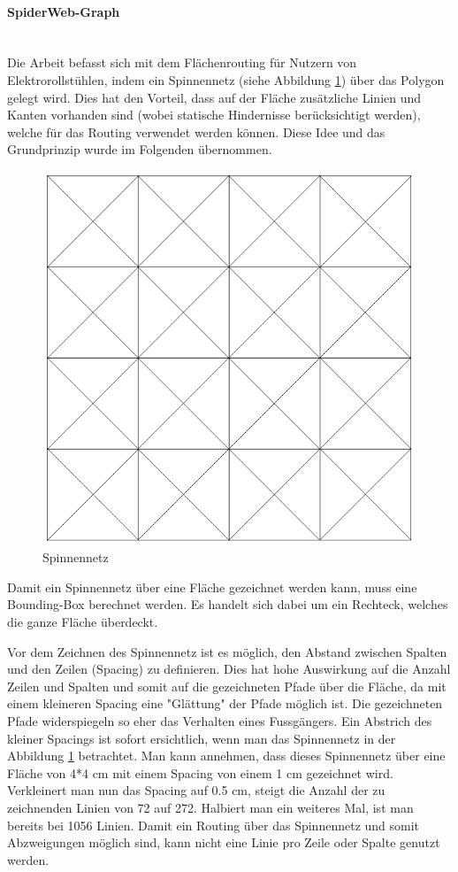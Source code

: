 \paragraph{SpiderWeb-Graph}\label{solution:SpiderWeb-Graph}~\\
Die Arbeit \cite{dzafic_spider_web_graph} befasst sich mit dem Flächenrouting für Nutzern von Elektrorollstühlen, indem ein Spinnennetz (siehe Abbildung \ref{fig:spiderweb}) über das Polygon gelegt wird. Dies hat den Vorteil, dass auf der Fläche zusätzliche Linien und Kanten vorhanden sind (wobei statische Hindernisse berücksichtigt werden), welche für das Routing verwendet werden können. Diese Idee und das Grundprinzip wurde im Folgenden übernommen.

\begin{figure}[ht]
\centering
\includegraphics[width=0.5\linewidth]{technicalreport/img/spiderweb}
\caption[Spinnennetz]{Spinnennetz}
\label{fig:spiderweb}
\end{figure}

Damit ein Spinnennetz über eine Fläche gezeichnet werden kann, muss eine Bounding-Box berechnet werden. Es handelt sich dabei um ein Rechteck, welches die ganze Fläche überdeckt. 

Vor dem Zeichnen des Spinnennetz ist es möglich, den Abstand zwischen Spalten und den Zeilen (Spacing) zu definieren. Dies hat hohe Auswirkung auf die Anzahl Zeilen und Spalten und somit auf die gezeichneten Pfade über die Fläche, da mit einem kleineren Spacing eine "Glättung" der Pfade möglich ist. Die gezeichneten Pfade widerspiegeln so eher das Verhalten eines Fussgängers. Ein Abstrich des kleiner Spacings ist sofort ersichtlich, wenn man das Spinnennetz in der Abbildung \ref{fig:spiderweb} betrachtet. Man kann annehmen, dass dieses Spinnennetz über eine Fläche von 4*4 cm mit einem Spacing von einem 1 cm gezeichnet wird. Verkleinert man nun das Spacing auf 0.5 cm, steigt die Anzahl der zu zeichnenden Linien von 72 auf 272. Halbiert man ein weiteres Mal, ist man bereits bei 1056 Linien. Damit ein Routing über das Spinnennetz und somit Abzweigungen möglich sind, kann nicht eine Linie pro Zeile oder Spalte genutzt werden.

